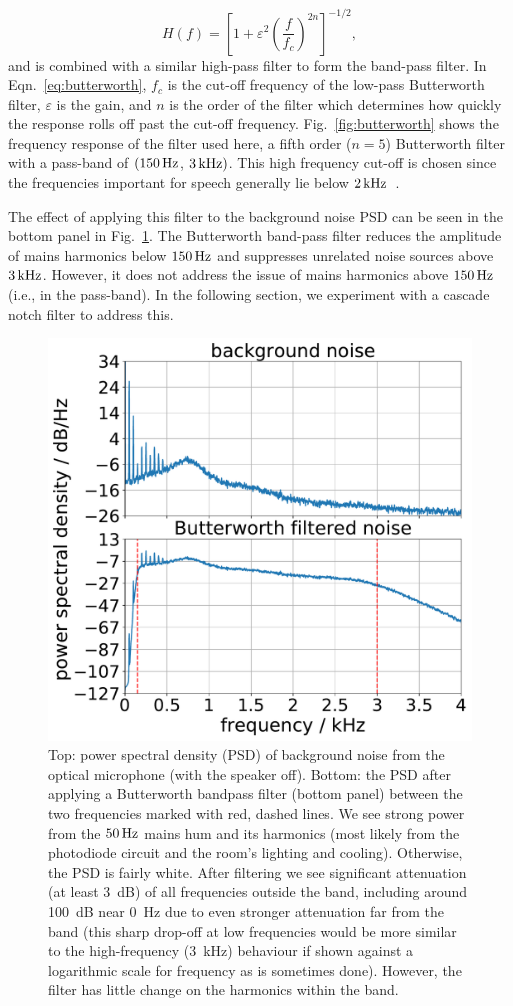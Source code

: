 \documentclass[aps,pra,superscriptaddress,reprint,nofootinbib]{revtex4-1}
\begin{document}
\begin{equation}
\label{eq:butterworth}
H(f) = \left[1+\varepsilon^2 \left( \frac{f}{f_c} \right)^{2n}\right]^{-1/2},
\end{equation}
and is combined with a similar high-pass filter to form the band-pass filter.
In Eqn.~\ref{eq:butterworth}, $f_c$ is the cut-off frequency of the low-pass Butterworth filter, $\varepsilon$ is the gain, and $n$ is the order of the filter which determines how quickly the response rolls off past the cut-off frequency. Fig.~\ref{fig:butterworth} shows the frequency response of the filter used here, a fifth order ($n = 5$) Butterworth filter with a pass-band of $(150\,{\rm Hz}$, $3\,{\rm kHz})$. This high frequency cut-off is chosen since the frequencies important for speech generally lie below $2\,{\rm kHz}$~\cite{speech_intelligibility}.

The effect of applying this filter to the background noise PSD can be seen in the bottom panel in Fig.~\ref{fig:psd_noise}. The Butterworth band-pass filter reduces the amplitude of mains harmonics below $150\,{\rm Hz}$ and suppresses unrelated noise sources above $3\,{\rm kHz}$. However, it does not address the issue of mains harmonics above $150\,{\rm Hz}$ (i.e., in the pass-band). In the following section, we experiment with a cascade notch filter to address this.

\begin{figure}
	\includegraphics[width=.45\textwidth]{figures/psd_butterworth_14_6.pdf}
	\caption{\label{fig:psd_noise}
Top: power spectral density (PSD) of background noise from the optical microphone (with the speaker off). 
Bottom: the PSD after applying a Butterworth bandpass filter (bottom panel) between the two frequencies marked with red, dashed lines. 
We see strong power from the $50\,{\rm Hz}$ mains hum and its harmonics (most likely from the photodiode circuit and the room’s lighting and cooling). Otherwise, the PSD is fairly white. 
After filtering we see significant attenuation (at least 3~dB) of all frequencies outside the band, including around 100~dB near 0~Hz due to even stronger attenuation far from the band (this sharp drop-off at low frequencies would be more similar to the high-frequency (3~kHz) behaviour if shown against a logarithmic scale for frequency as is sometimes done). However, the filter has little change on the harmonics within the band.
}
\end{figure}
\end{document}
